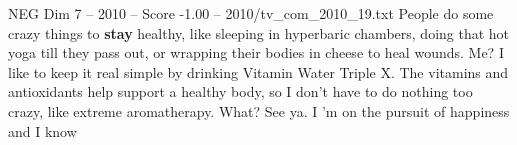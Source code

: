 \begin{textsample}{NEG Dim 7 – 2010 – Score -1.00 – 2010/tv\_com\_2010\_19.txt}  \label{ex:f7_neg_025}
People do some crazy things to \textbf{stay} healthy, like sleeping in hyperbaric chambers, doing that hot yoga till they pass out, or wrapping their bodies in cheese to heal wounds.
Me?
I like to keep it real simple by drinking Vitamin Water Triple X.
The vitamins and antioxidants help support a healthy body, so I don't have to do nothing too crazy, like extreme aromatherapy.
What?
See ya.
I 'm on the pursuit of happiness and I know

\end{textsample}
